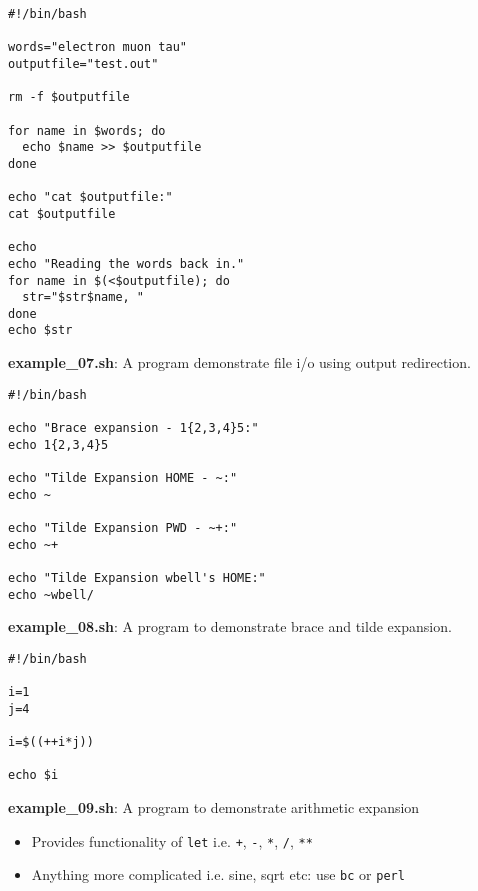 \documentclass[17pt,dvips]{foils}
\begin{document}


\begin{verbatim}
#!/bin/bash

words="electron muon tau"
outputfile="test.out"
 
rm -f $outputfile
 
for name in $words; do
  echo $name >> $outputfile
done
 
echo "cat $outputfile:"
cat $outputfile
 
echo
echo "Reading the words back in."
for name in $(<$outputfile); do
  str="$str$name, "
done
echo $str
\end{verbatim}
{\bf example\_07.sh}: A program demonstrate file i/o using output redirection.



\begin{verbatim}
#!/bin/bash
 
echo "Brace expansion - 1{2,3,4}5:"
echo 1{2,3,4}5
 
echo "Tilde Expansion HOME - ~:"
echo ~
 
echo "Tilde Expansion PWD - ~+:"
echo ~+
 
echo "Tilde Expansion wbell's HOME:"
echo ~wbell/
\end{verbatim}
{\bf example\_08.sh}: A program to demonstrate brace and tilde expansion.


\begin{verbatim}
#!/bin/bash
  
i=1
j=4

i=$((++i*j))
                                                                         
echo $i
\end{verbatim}
{\bf example\_09.sh}: A program to demonstrate arithmetic expansion

\begin{itemize}
\item Provides functionality of \texttt{let} i.e. \texttt{+}, 
\texttt{-}, \texttt{*}, \texttt{/}, \texttt{**}
\item Anything more complicated i.e. sine, sqrt etc: use \texttt{bc} or 
\texttt{perl}
\end{itemize}
\end{document}
